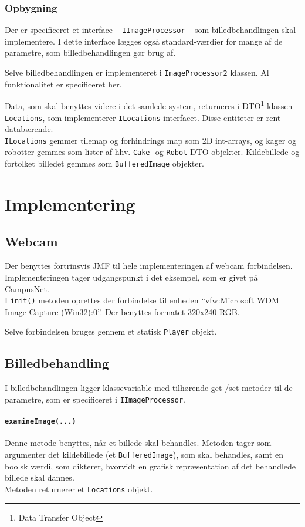 \subsubsection{Opbygning}
Der er specificeret et interface -- \texttt{IImageProcessor} -- som billedbehandlingen skal implementere. I dette interface lægges også standard-værdier for mange af de parametre, som billedbehandlingen gør brug af.

Selve billedbehandlingen er implementeret i \texttt{ImageProcessor2} klassen.  Al funktionalitet er specificeret her.

Data, som skal benyttes videre i det samlede system, returneres i DTO\footnote{Data Transfer Object} klassen \texttt{Locations}, som implementerer \texttt{ILocations} interfacet. Disse entiteter er rent databærende.\\
\texttt{ILocations} gemmer tilemap og forhindrings map som 2D int-arrays, og kager og robotter gemmes som lister af hhv. \texttt{Cake}- og \texttt{Robot} DTO-objekter. Kildebillede og fortolket billedet gemmes som \texttt{BufferedImage} objekter.

\section{Implementering}
\subsection{Webcam}
Der benyttes fortrinsvis JMF til hele implementeringen af webcam forbindelsen. Implementeringen tager udgangspunkt i det eksempel, som er givet på CampusNet. \\
I \texttt{init()} metoden oprettes der forbindelse til enheden "`vfw:Microsoft WDM Image Capture (Win32):0"'. Der benyttes formatet 320x240 RGB.

Selve forbindelsen bruges gennem et statisk \texttt{Player} objekt.

\subsection{Billedbehandling}
I billedbehandlingen ligger klassevariable med tilhørende get-/set-metoder til de parametre, som er specificeret i \texttt{IImageProcessor}.

\paragraph{\texttt{examineImage(...)}}
Denne metode benyttes, når et billede skal behandles. Metoden tager som argumenter det kildebillede (et \texttt{BufferedImage}), som skal behandles, samt en boolsk værdi, som dikterer, hvorvidt en grafisk repræsentation af det behandlede billede skal dannes.\\
Metoden returnerer et \texttt{Locations} objekt.


